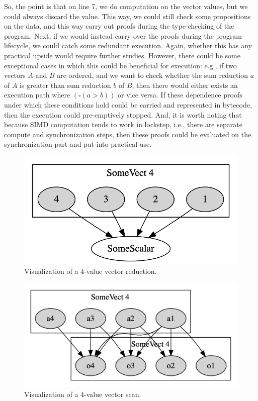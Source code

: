 \documentclass{report}
\begin{document}
So, the point is that on line 7, we do computation on the vector values, but we could always discard the value. This way, we could still check some propositions on the data, and this way carry out proofs during the type-checking of the program. Next, if we would instead carry over the proofs during the program lifecycle, we could catch some redundant execution. Again, whether this has any practical upside would require further studies. However, there could be some exceptional cases in which this could be beneficial for execution: e.g., if two vectors $A$ and $B$ are ordered, and we want to check whether the sum reduction $a$ of $A$ is greater than sum reduction $b$ of $B$, then there would either exists an execution path where $(\square (a>b))$ or vice versa. If these dependence proofs under which these conditions hold could be carried and represented in bytecode, then the execution could pre-emptively stopped. And, it is worth noting that because SIMD computation tends to work in lockstep, i.e., there are separate compute and synchronization steps, then these proofs could be evaluated on the synchronization part and put into practical use.

\begin{figure}
  \centering
  \includegraphics[scale=0.25]{reduce.png}
  \caption{Visualization of a 4-value vector reduction.}
  \label{fig:reduce}
\end{figure}

\begin{figure}
  \centering
  \includegraphics[scale=0.25]{scan.png}
  \caption{Visualization of a 4-value vector scan.}
  \label{fig:scan1}
\end{figure}
\end{document}
